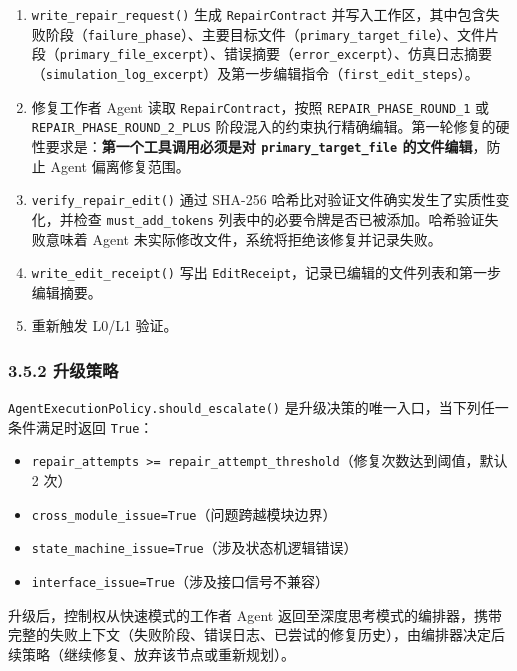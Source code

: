 \begin{enumerate}
\def\labelenumi{\arabic{enumi}.}
\tightlist
\item
  \texttt{write\_repair\_request()} 生成 \texttt{RepairContract}
  并写入工作区，其中包含失败阶段（\texttt{failure\_phase}）、主要目标文件（\texttt{primary\_target\_file}）、文件片段（\texttt{primary\_file\_excerpt}）、错误摘要（\texttt{error\_excerpt}）、仿真日志摘要（\texttt{simulation\_log\_excerpt}）及第一步编辑指令（\texttt{first\_edit\_steps}）。
\item
  修复工作者 Agent 读取 \texttt{RepairContract}，按照
  \texttt{REPAIR\_PHASE\_ROUND\_1} 或
  \texttt{REPAIR\_PHASE\_ROUND\_2\_PLUS}
  阶段混入的约束执行精确编辑。第一轮修复的硬性要求是：\textbf{第一个工具调用必须是对
  \texttt{primary\_target\_file} 的文件编辑}，防止 Agent 偏离修复范围。
\item
  \texttt{verify\_repair\_edit()} 通过 SHA-256
  哈希比对验证文件确实发生了实质性变化，并检查
  \texttt{must\_add\_tokens}
  列表中的必要令牌是否已被添加。哈希验证失败意味着 Agent
  未实际修改文件，系统将拒绝该修复并记录失败。
\item
  \texttt{write\_edit\_receipt()} 写出
  \texttt{EditReceipt}，记录已编辑的文件列表和第一步编辑摘要。
\item
  重新触发 L0/L1 验证。
\end{enumerate}

\subsubsection{3.5.2 升级策略}\label{ux5347ux7ea7ux7b56ux7565}

\texttt{AgentExecutionPolicy.should\_escalate()}
是升级决策的唯一入口，当下列任一条件满足时返回 \texttt{True}：

\begin{itemize}
\tightlist
\item
  \texttt{repair\_attempts\ \textgreater{}=\ repair\_attempt\_threshold}（修复次数达到阈值，默认
  2 次）
\item
  \texttt{cross\_module\_issue=True}（问题跨越模块边界）
\item
  \texttt{state\_machine\_issue=True}（涉及状态机逻辑错误）
\item
  \texttt{interface\_issue=True}（涉及接口信号不兼容）
\end{itemize}

升级后，控制权从快速模式的工作者 Agent
返回至深度思考模式的编排器，携带完整的失败上下文（失败阶段、错误日志、已尝试的修复历史），由编排器决定后续策略（继续修复、放弃该节点或重新规划）。

